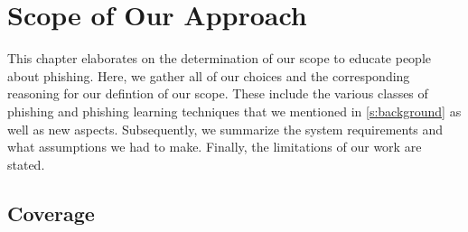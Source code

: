 \section{Scope of Our Approach}
This chapter elaborates on the determination of our scope to educate people about phishing. 
Here, we gather all of our choices and the corresponding reasoning for our defintion of our scope. 
These include the various classes of phishing and phishing learning techniques that we mentioned in \autoref{s:background} as well as new aspects.
Subsequently, we summarize the system requirements and what assumptions we had to make. 
Finally, the limitations of our work are stated.

\subsection{Coverage}
\label{s:coverage}
